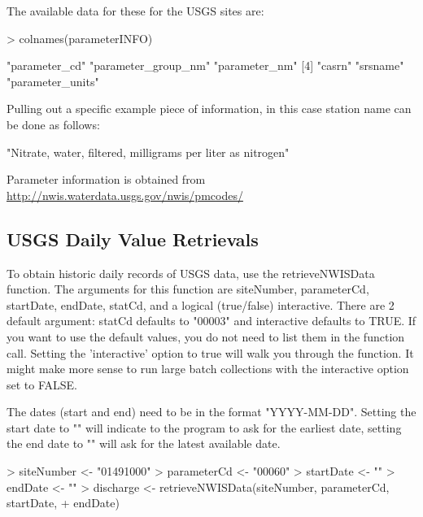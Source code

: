 \documentclass[a4paper,11pt]{article}
\begin{document}
The available data for these for the USGS sites are:
\begin{Schunk}
\begin{Sinput}
> colnames(parameterINFO)
\end{Sinput}
\begin{Soutput}
[1] "parameter_cd"       "parameter_group_nm" "parameter_nm"      
[4] "casrn"              "srsname"            "parameter_units"   
\end{Soutput}
\end{Schunk}
Pulling out a specific example piece of information, in this case station name can be done as follows:
\begin{Schunk}
\begin{Soutput}
[1] "Nitrate, water, filtered, milligrams per liter as nitrogen"
\end{Soutput}
\end{Schunk}
Parameter information is obtained from \url{http://nwis.waterdata.usgs.gov/nwis/pmcodes/}



\subsection{USGS Daily Value Retrievals}
To obtain historic daily records of USGS data, use the retrieveNWISData function. The arguments for this function are siteNumber, parameterCd, startDate, endDate, statCd, and a logical (true/false) interactive. There are 2 default argument: statCd defaults to "00003" and interactive defaults to TRUE.  If you want to use the default values, you do not need to list them in the function call. Setting the 'interactive' option to true will walk you through the function. It might make more sense to run large batch collections with the interactive option set to FALSE. 

The dates (start and end) need to be in the format "YYYY-MM-DD".  Setting the start date to "" will indicate to the program to ask for the earliest date, setting the end date to "" will ask for the latest available date.

\begin{Schunk}
\begin{Sinput}
> siteNumber <- "01491000"
> parameterCd <- "00060"
> startDate <- ""
> endDate <- ""
> discharge <- retrieveNWISData(siteNumber, parameterCd, startDate, 
+     endDate)
\end{Sinput}
\end{Schunk}
\end{document}

